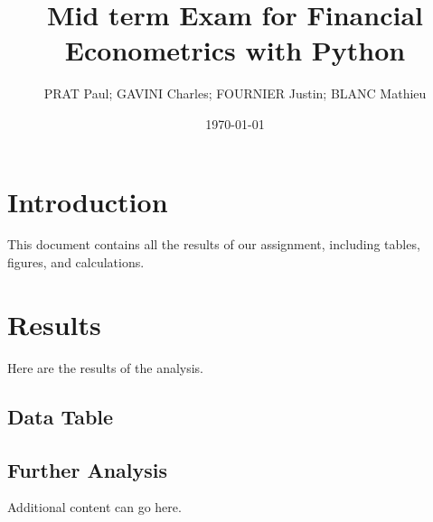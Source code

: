 \documentclass{article}
\begin{document}
\title{Mid term Exam for Financial Econometrics with Python}
\author{PRAT Paul; GAVINI Charles; FOURNIER Justin; BLANC Mathieu}
\date{\today}

\maketitle

\section{Introduction}
This document contains all the results of our assignment, including tables, figures, and calculations.

\section{Results}

Here are the results of the analysis.

\subsection{Data Table}

  

\subsection{Further Analysis}

Additional content can go here.
\end{document}
